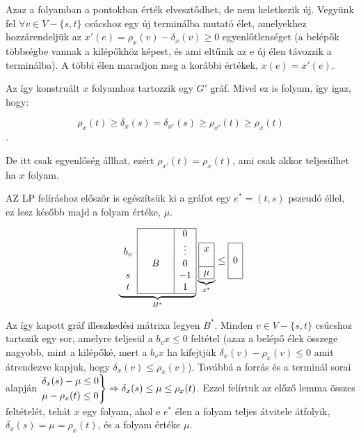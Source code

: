 Azaz a folyamban a pontokban érték elvesztődhet, de nem keletkezik új.
Vegyünk fel $\forall v \in V-\{s,t\}$ csúcshoz egy új terminálba mutató élet,
amelyekhez hozzárendeljük az $x'(e)=\rho_x(v)-\delta_x(v) \geq 0$
egyenlőtlenséget (a belépők többségbe vannak a kilépőkhöz képest, és ami
eltűnik az e új élen távozzik a terminálba). A többi élen maradjon meg a
korábbi értékek, $x(e)=x'(e)$.

Az így konstruált $x$ folyamhoz tartozzik egy $G'$ gráf.  Mivel ez is folyam,
így igaz, hogy:

\[\rho_{x}(t) \geq \delta_{x}(s) = \delta_{x'}(s) \geq \rho_{x'}(t) \geq 
\rho_{x}(t)\]. 

De itt csak egyenlőség állhat, ezért $\rho_{x'}(t)=\rho_{x}(t)$, ami csak akkor 
teljesülhet ha $x$ folyam.

AZ LP felíráshoz először is egészítsük ki a gráfot egy $e^*=(t,s)$ pszeudó
éllel, ez lesz később majd a folyam értéke, $\mu$.

\begin{wrapfigure}{l}{0.35\textwidth}
\begin{center}
\vspace{-1.3cm}
\begin{displaymath}
\underbrace{
\begin{array}{c|ccc|c|}
\cline{2-5}
&  & & &0 \\
b_v&  & & & \vdots \\
&  & B& & 0\\
s &   & & &-1 \\
t &   & & & 1 \\
\cline{2-5}
\end{array}}_{B^*}
\underbrace{
\begin{array}{|c|}
\hline
x\\
\\
\hline
\mu\\
\hline
\end{array}}_{x^*}
\leq
\begin{array}{|c|}
\hline
\\
0\\
\\
\hline
\end{array}
\end{displaymath}
\vspace{-1.3cm}
\end{center}
\end{wrapfigure}	
Az így kapott gráf illeszkedési mátrixa legyen $B^*$. Minden $v \in V - \{s,t\}$
csúcshoz tartozik egy sor, amelyre teljesül a $b_vx\leq 0$ feltétel (azaz a
belépő élek összege nagyobb, mint a kilépőké, mert a $b_vx$ ha kifejtjük
$\delta_x(v) - \rho_x(v) \leq 0 $ amit átrendezve kapjuk, hogy $ \delta_x(v)
\leq \rho_x(v)$).
Továbbá a forrás és a terminál sorai alapján $\begin{rcases} \delta_x(s)-\mu
\leq 0 \\
\mu - \rho_x(t) \leq 0 \end{rcases} \Rightarrow \delta_x(s) \leq \mu \leq
\rho_x(t)$. Ezzel felírtuk az előző lemma összes feltételét, tehát $x$ egy
folyam, ahol e $e^*$ élen a folyam teljes átvitele átfolyik,
$\delta_x(s)=\mu=\rho_x(t)$, és a folyam értéke $\mu$.

